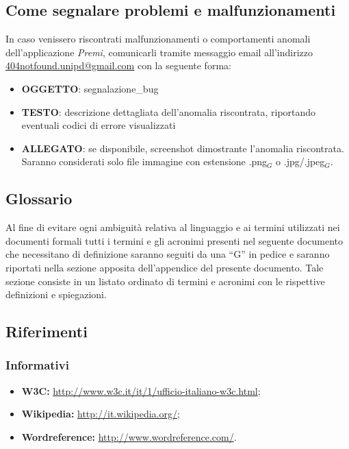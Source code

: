 \subsection{Come segnalare problemi e malfunzionamenti}
In caso venissero riscontrati malfunzionamenti o comportamenti anomali dell'applicazione \emph{Premi}, comunicarli tramite messaggio email all'indirizzo \href{mailto:404notfound.unipd@gmail.com}{404notfound.unipd@gmail.com} con la seguente forma:
\begin{itemize}
\item \textbf{OGGETTO}: segnalazione\_bug
\item \textbf{TESTO}: descrizione dettagliata dell'anomalia riscontrata, riportando eventuali codici di errore visualizzati
\item \textbf{ALLEGATO}: se disponibile, screenshot dimostrante l'anomalia riscontrata. Saranno considerati solo file immagine con estensione .png$_G$ o .jpg/.jpeg$_G$.
\end{itemize}

\subsection{Glossario}
Al fine di evitare ogni ambiguità relativa al linguaggio e ai termini utilizzati nei documenti formali tutti i termini e gli acronimi presenti nel seguente documento che necessitano di definizione saranno seguiti da una ``G'' in pedice e saranno riportati nella sezione apposita dell'appendice del presente documento. Tale sezione consiste in un listato ordinato di termini e acronimi con le rispettive definizioni e spiegazioni.

\subsection{Riferimenti}
\subsubsection{Informativi}
\begin{itemize}
	\item \textbf{W3C:} \href{http://www.w3c.it/it/1/ufficio-italiano-w3c.html}{http://www.w3c.it/it/1/ufficio-italiano-w3c.html};
	\item \textbf{Wikipedia:} \href{http://it.wikipedia.org/}{http://it.wikipedia.org/}; 
	\item \textbf{Wordreference:} \href{http://www.wordreference.com/}{http://www.wordreference.com/}.
\end{itemize}

\newpage
